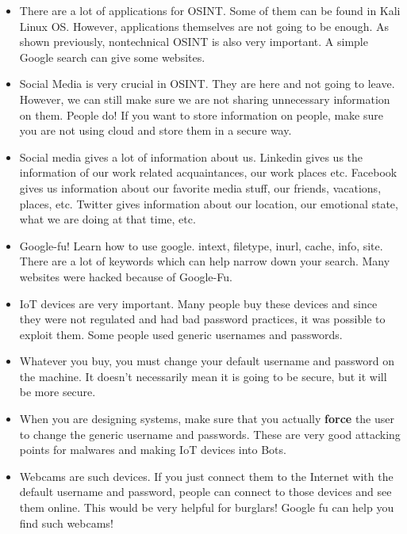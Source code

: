 \documentclass[12pt]{article}
\newcommand{\red}[1]{{\color{red} #1}}
\newcommand{\blue}[1]{{\color{blue} #1}}
\begin{document}
\begin{itemize}[itemsep=3em]
	\item There are a lot of applications for OSINT. Some of them can be found in Kali Linux OS. However, applications themselves are not going to be enough. As shown previously, nontechnical OSINT is also very important. A simple Google search can give some websites.
	
	\item Social Media is very crucial in OSINT. They are here and not going to leave. However, we can still make sure we are not sharing unnecessary information on them. People do! \blue{If you want to store information on people, make sure you are not using cloud and store them in a secure way.}
	
	\item Social media gives a lot of information about us. Linkedin gives us the information of our work related acquaintances, our work places etc. Facebook gives us information about our favorite media stuff, our friends, vacations, places, etc. Twitter gives information about our location, our emotional state, what we are doing at that time, etc.
	
	\item Google-fu! Learn how to use google. intext, filetype, inurl, cache, info, site. There are a lot of keywords which can help narrow down your search. Many websites were hacked because of Google-Fu.
	
	\item IoT devices are very important. Many people buy these devices and since they were not regulated and had bad password practices, it was possible to exploit them. Some people used generic usernames and passwords.
	
	\item \red{Whatever you buy, you must change your default username and password on the machine. It doesn't necessarily mean it is going to be secure, but it will be more secure.}
	
	\item When you are designing systems, make sure that you actually \textbf{force}  the user to change the generic username and passwords. These are very good attacking points for malwares and making IoT devices into Bots.
	
	\item Webcams are such devices. If you just connect them to the Internet with the default username and password, people can connect to those devices and see them online. This would be very helpful for burglars! Google fu can help you find such webcams! 
	

\end{itemize}
\end{document}
